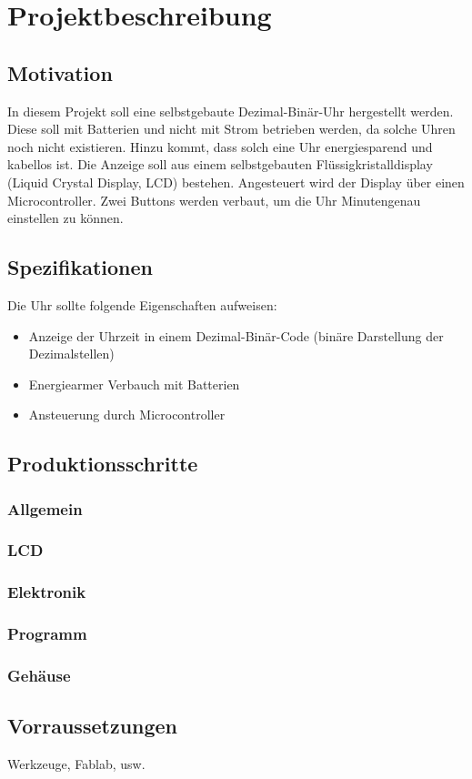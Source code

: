 \section{Projektbeschreibung}
\subsection{Motivation}
In diesem Projekt soll eine selbstgebaute Dezimal-Binär-Uhr hergestellt werden. Diese soll mit Batterien und nicht mit Strom betrieben werden, da solche Uhren noch nicht existieren. Hinzu kommt, dass solch eine Uhr energiesparend und kabellos ist. Die Anzeige soll aus einem selbstgebauten Flüssigkristalldisplay (Liquid Crystal Display, LCD) bestehen. Angesteuert wird der Display über einen Microcontroller. Zwei Buttons werden verbaut, um die Uhr Minutengenau einstellen zu können.

\subsection{Spezifikationen}
Die Uhr sollte folgende Eigenschaften aufweisen:
\begin{itemize}
\item Anzeige der Uhrzeit in einem Dezimal-Binär-Code (binäre Darstellung der Dezimalstellen)
\item Energiearmer Verbauch mit Batterien
\item Ansteuerung durch Microcontroller
\end{itemize}

\subsection{Produktionsschritte}
\subsubsection*{Allgemein}
\subsubsection*{LCD}
\subsubsection*{Elektronik}
\subsubsection*{Programm}
\subsubsection*{Gehäuse}



\subsection{Vorraussetzungen}
Werkzeuge, Fablab, usw.